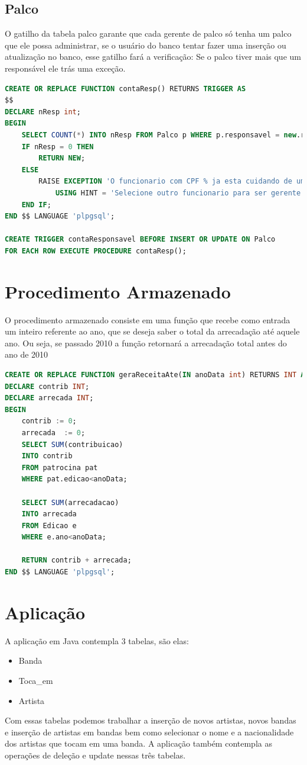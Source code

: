 \documentclass[12pt]{article}
\begin{document}
\subsection{Palco}
O gatilho da tabela palco garante que cada gerente de palco só tenha um palco que ele possa administrar, se o usuário do banco tentar fazer uma inserção ou atualização no banco, esse gatilho fará a verificação: Se o palco tiver mais que um responsável ele trás uma exceção.
\begin{lstlisting}[language=sql]
CREATE OR REPLACE FUNCTION contaResp() RETURNS TRIGGER AS
$$
DECLARE nResp int;
BEGIN
	SELECT COUNT(*) INTO nResp FROM Palco p WHERE p.responsavel = new.responsavel;
	IF nResp = 0 THEN
		RETURN NEW;
	ELSE
		RAISE EXCEPTION 'O funcionario com CPF % ja esta cuidando de um palco',new.responsavel
			USING HINT = 'Selecione outro funcionario para ser gerente do palco';
	END IF;
END $$ LANGUAGE 'plpgsql';

CREATE TRIGGER contaResponsavel BEFORE INSERT OR UPDATE ON Palco
FOR EACH ROW EXECUTE PROCEDURE contaResp();
\end{lstlisting}
\section{Procedimento Armazenado}
O procedimento armazenado consiste em uma função que recebe como entrada um inteiro referente ao ano, que se deseja saber o total da arrecadação até aquele ano. Ou seja, se passado 2010 a função retornará a arrecadação total antes do ano de 2010

\begin{lstlisting}[language=sql]
CREATE OR REPLACE FUNCTION geraReceitaAte(IN anoData int) RETURNS INT AS $$
DECLARE	contrib INT;
DECLARE arrecada INT;
BEGIN
	contrib := 0;
	arrecada  := 0;
	SELECT SUM(contribuicao)
	INTO contrib
	FROM patrocina pat
	WHERE pat.edicao<anoData;

	SELECT SUM(arrecadacao)
	INTO arrecada
	FROM Edicao e
	WHERE e.ano<anoData;
	
	RETURN contrib + arrecada;
END $$ LANGUAGE 'plpgsql';
\end{lstlisting}

\section{Aplicação}

A aplicação em Java contempla 3 tabelas, são elas:
\begin{itemize}
\item Banda
\item Toca\_em
\item Artista
\end{itemize}
Com essas tabelas podemos trabalhar a inserção de novos artistas, novos bandas e inserção de artistas em bandas bem como selecionar o nome e a nacionalidade dos artistas que tocam em uma banda.
A aplicação também contempla as operações de deleção e update nessas três tabelas.
\end{document}
